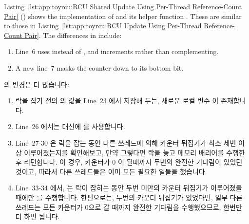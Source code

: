 Listing~\ref{lst:app:toyrcu:RCU Shared Update Using Per-Thread Reference-Count Pair}
()
shows the implementation of  and its helper
function .
These are similar to those in
Listing~\ref{lst:app:toyrcu:RCU Update Using Per-Thread Reference-Count Pair}.
The differences in  include:
\begin{enumerate}
\item	Line~6 uses  instead of ,
	and increments rather than complementing.
\item	A new line~7 masks the counter down to its bottom bit.
\end{enumerate}
\fi

 의 변경은 더 많습니다:
\begin{enumerate}
\item	락을 잡기 전의  의 값을 Line~23 에서 저장해 두는, 새로운
	로컬 변수  이 존재합니다.
\item	Line~26 에서는  대신에  를
	사용합니다.
\item	Line~27-30 은 락을 잡는 동안 다른 쓰레드에 의해 카운터 뒤집기가 최소
	세번 이상 이루어졌는지를 확인해보고, 만약 그렇다면 락을 놓고 메모리
	배리어를 수행한 후 리턴합니다.
	이 경우, 카운터가 0 이 될때까지 두번의 완전한 기다림이 있었던 것이고,
	따라서 다른 쓰레드들은 이미 모든 필요한 일들을 했습니다.
\item	Line~33-34 에서,  는 락이 잡히는 동안 두번
	미만의 카운터 뒤집기가 이루어졌을 때에만 
	를 수행합니다.
	한편으로는, 두번의 카운터 뒤집기가 있었다면, 일부 다른 쓰레드는 모든
	카운터가 0으로 갈 때까지 완전한 기다림을 수행했으므로, 한번만 더 하면
	됩니다.
\end{enumerate}
\iffalse

The changes to \co{synchronize_rcu()} are more pervasive:
\begin{enumerate}
\item	There is a new \co{oldctr} local variable that captures
	the pre-lock-acquisition value of \co{rcu_idx} on
	line~23.
\item	Line~26 uses \co{READ_ONCE()} instead of \co{atomic_read()}.
\item	Lines~27-30 check to see if at least three counter flips were
	performed by other threads while the lock was being acquired,
	and, if so, releases the lock, does a memory barrier, and returns.
	In this case, there were two full waits for the counters to
	go to zero, so those other threads already did all the required work.
\item	At lines~33-34, \co{flip_counter_and_wait()} is only
	invoked a second time if there were fewer than two counter flips
	while the lock was being acquired.
	On the other hand, if there were two counter flips, some other
	thread did one full wait for all the counters to go to zero,
	so only one more is required.
\end{enumerate}
\fi

